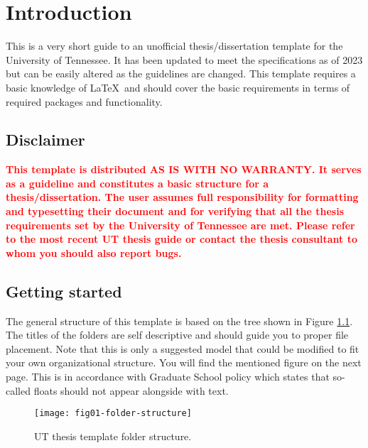 \chapter{Introduction} \label{ch:introduction}

This is a very short guide to an unofficial thesis/dissertation template for the University of Tennessee. It has been updated to meet the specifications as of 2023 but can be easily altered as the guidelines are changed. This template requires a basic knowledge of \LaTeX\ and should cover the basic requirements in terms of required packages and functionality.

\section{Disclaimer}
\textcolor{red}{\bf
This template is distributed AS IS WITH NO WARRANTY. It serves as a guideline and constitutes a basic structure for a thesis/dissertation. The user assumes full responsibility for formatting and typesetting their document and for verifying that all the thesis requirements set by the University of Tennessee are met. Please refer to the most recent UT thesis guide 
or contact the thesis consultant to whom you should also report bugs.}

\section{Getting started}
The general structure of this template is based on the tree shown in Figure \ref{fig:intro-folder-structure}. The titles of the folders are self descriptive and should guide you to proper file placement. Note that this is only a suggested model that could be modified to fit your own organizational structure.
You will find the mentioned figure on the next page. This is in accordance with Graduate School policy which states that so-called floats should not appear alongside with text. 

\begin{figure}[p]
  \centering
  \texttt{[image: fig01-folder-structure]}\\
  \caption{UT thesis template folder structure.}\label{fig:intro-folder-structure}
\end{figure}

